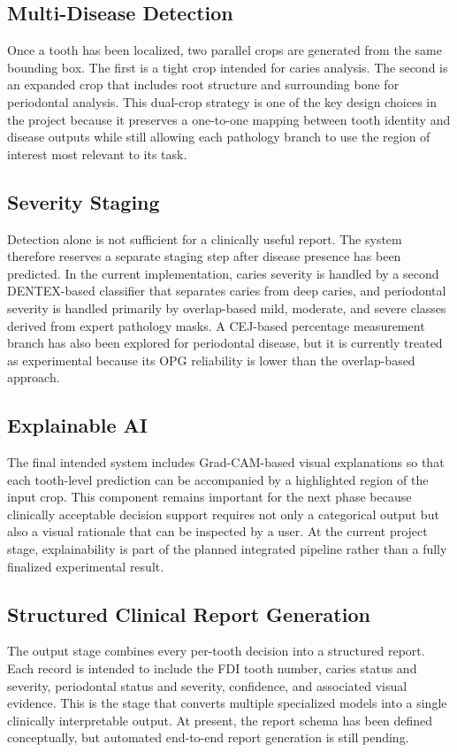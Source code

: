\subsection{Multi-Disease Detection}
Once a tooth has been localized, two parallel crops are generated from the same
bounding box. The first is a tight crop intended for caries analysis. The
second is an expanded crop that includes root structure and surrounding bone
for periodontal analysis. This dual-crop strategy is one of the key design
choices in the project because it preserves a one-to-one mapping between tooth
identity and disease outputs while still allowing each pathology branch to use
the region of interest most relevant to its task.

\subsection{Severity Staging}
Detection alone is not sufficient for a clinically useful report. The system
therefore reserves a separate staging step after disease presence has been
predicted. In the current implementation, caries severity is handled by a
second DENTEX-based classifier that separates caries from deep caries, and
periodontal severity is handled primarily by overlap-based mild, moderate, and
severe classes derived from expert pathology masks. A CEJ-based percentage
measurement branch has also been explored for periodontal disease, but it is
currently treated as experimental because its OPG reliability is lower than the
overlap-based approach.

\subsection{Explainable AI}
The final intended system includes Grad-CAM-based visual explanations so that
each tooth-level prediction can be accompanied by a highlighted region of the
input crop. This component remains important for the next phase because
clinically acceptable decision support requires not only a categorical output
but also a visual rationale that can be inspected by a user. At the current
project stage, explainability is part of the planned integrated pipeline rather
than a fully finalized experimental result.

\subsection{Structured Clinical Report Generation}
The output stage combines every per-tooth decision into a structured report.
Each record is intended to include the FDI tooth number, caries status and
severity, periodontal status and severity, confidence, and associated visual
evidence. This is the stage that converts multiple specialized models into a
single clinically interpretable output. At present, the report schema has been
defined conceptually, but automated end-to-end report generation is still
pending.

